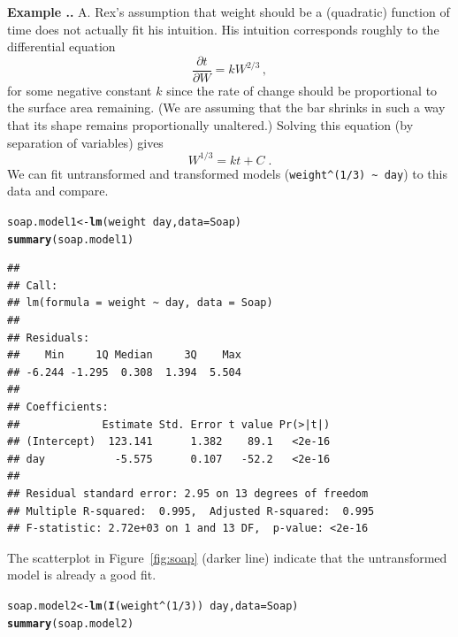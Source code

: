 \documentclass[twoside]{book}\usepackage[]{graphicx}\usepackage[]{xcolor}
\makeatletter
\newcommand{\hlnum}[1]{\textcolor[rgb]{0.686,0.059,0.569}{#1}}%
\newcommand{\hlopt}[1]{\textcolor[rgb]{0,0,0}{#1}}%
\newcommand{\hlstd}[1]{\textcolor[rgb]{0.345,0.345,0.345}{#1}}%
\newcommand{\hlkwb}[1]{\textcolor[rgb]{0.69,0.353,0.396}{#1}}%
\newcommand{\hlkwc}[1]{\textcolor[rgb]{0.333,0.667,0.333}{#1}}%
\newcommand{\hlkwd}[1]{\textcolor[rgb]{0.737,0.353,0.396}{\textbf{#1}}}%
\newenvironment{kframe}{%
 \def\at@end@of@kframe{}%
 \ifinner\ifhmode%
  \def\at@end@of@kframe{\end{minipage}}%
  \begin{minipage}{\columnwidth}%
 \fi\fi%
 \def\FrameCommand##1{\hskip\@totalleftmargin \hskip-\fboxsep
 \colorbox{shadecolor}{##1}\hskip-\fboxsep
     \hskip-\linewidth \hskip-\@totalleftmargin \hskip\columnwidth}%
 \MakeFramed {\advance\hsize-\width
   \@totalleftmargin\z@ \linewidth\hsize
   \@setminipage}}%
 {\par\unskip\endMakeFramed%
 \at@end@of@kframe}
\newenvironment{knitrout}{}{} %
\newcommand{\Partial}[2]{\frac{\partial #1}{\partial #2}}
\def\answer{{\sf A. }}
\newcounter{example}[section]
\newenvironment{example}%
{\refstepcounter{example}%
\textbf{Example \thesection.\arabic{example}. }}%
{}
\makeatother
\begin{document}
\begin{example}
\answer
Rex's assumption that weight should be a (quadratic) function of time 
does not actually fit his intuition.  His intuition corresponds roughly to the 
differential equation
\[
\Partial{t}{W} = k W^{2/3}\,,
\]
for some negative constant $k$ since the rate of change should be 
proportional to the surface area remaining.  
(We are assuming that the bar shrinks in such a way 
that its shape remains proportionally unaltered.)
Solving this equation (by separation of variables) gives
\[
W^{1/3} = k t + C
\;.
\]
We can fit untransformed and transformed models 
(\verb!weight^(1/3) ~ day!) to this data and compare.
\begin{knitrout}
\color{fgcolor}\begin{kframe}
\begin{alltt}
\hlstd{soap.model1} \hlkwb{<-} \hlkwd{lm}\hlstd{(weight} \hlopt{~} \hlstd{day,} \hlkwc{data} \hlstd{= Soap)}
\hlkwd{summary}\hlstd{(soap.model1)}
\end{alltt}
\begin{verbatim}
## 
## Call:
## lm(formula = weight ~ day, data = Soap)
## 
## Residuals:
##    Min     1Q Median     3Q    Max 
## -6.244 -1.295  0.308  1.394  5.504 
## 
## Coefficients:
##             Estimate Std. Error t value Pr(>|t|)
## (Intercept)  123.141      1.382    89.1   <2e-16
## day           -5.575      0.107   -52.2   <2e-16
## 
## Residual standard error: 2.95 on 13 degrees of freedom
## Multiple R-squared:  0.995,	Adjusted R-squared:  0.995 
## F-statistic: 2.72e+03 on 1 and 13 DF,  p-value: <2e-16
\end{verbatim}
\end{kframe}
\end{knitrout}
The scatterplot in Figure~\ref{fig:soap} 
(darker line) indicate that the untransformed model is already a good fit.
%
\begin{knitrout}
\color{fgcolor}\begin{kframe}
\begin{alltt}
\hlstd{soap.model2} \hlkwb{<-} \hlkwd{lm}\hlstd{(}\hlkwd{I}\hlstd{(weight}\hlopt{^}\hlstd{(}\hlnum{1}\hlopt{/}\hlnum{3}\hlstd{))} \hlopt{~} \hlstd{day,} \hlkwc{data} \hlstd{= Soap)}
\hlkwd{summary}\hlstd{(soap.model2)}
\end{alltt}

\end{kframe}
\end{knitrout}
\end{example}
\end{document}
